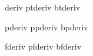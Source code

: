 \newcommand{\bincoef}[1]{\ensuremath{\begin{pmatrix} #1 \end{pmatrix}}}

\newcommand{\adj}[1]{#1^{\dagger}}
\newcommand{\op}[1]{\hat{#1}}

\newcommand{\vecnabla}{\vc{\nabla}}
\newcommand{\grad}{\nabla}
\renewcommand{\div}{\vecnabla\cdot}
\newcommand{\curl}{\vecnabla\times}
\newcommand{\laplacian}{\nabla^2}  %



\NewDocumentCommand{}

\NewDocumentCommand{}
\DeclareDocumentCommand{}
\DeclareDocumentCommand{}
\DeclareDocumentCommand{}
\DeclareDocumentCommand{}

\newcommand{\leb}{\ensuremath{\lambda}}

\newcommand{\func}[1]{\mathrm{#1}}
\newcommand{\expp}[1]{\func{e}^{#1}}
\newcommand{\expb}[1]{\exp\left(#1\right)}
\newcommand{\deltaf}[1]{\func{\delta} (#1)}
\DeclareMathOperator{\asinh}{asinh}


\newcommand\defineDerivateCommand[2]{%
    \expandafter\newcommand\csname #1\endcsname{\deriv{#2}}
    \expandafter\newcommand\csname p#1\endcsname{\deriv[\parenthesize]{#2}}
    \expandafter\newcommand\csname b#1\endcsname{\deriv[\bracketize]{#2}}
}
\defineDerivateCommand{tderiv}{\dif}
\defineDerivateCommand{pderiv}{\del}
\defineDerivateCommand{fderiv}{\delta}

